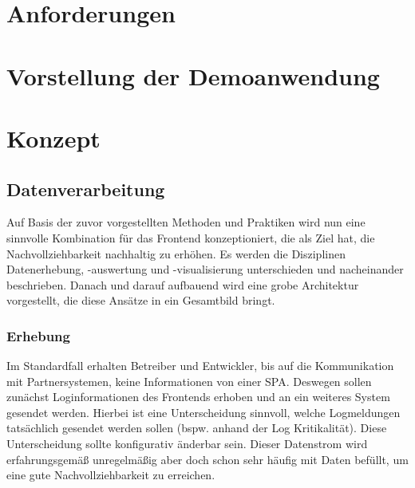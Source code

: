 	
\section{Anforderungen}

	
\section{Vorstellung der Demoanwendung}

	
\newpage
	
\section{Konzept}
	
	\subsection{Datenverarbeitung}

	Auf Basis der zuvor vorgestellten Methoden und Praktiken wird nun eine sinnvolle Kombination für das Frontend konzeptioniert, die als Ziel hat, die Nachvollziehbarkeit nachhaltig zu erhöhen. Es werden die Disziplinen Datenerhebung, -auswertung und -visualisierung unterschieden und nacheinander beschrieben. Danach und darauf aufbauend wird eine grobe Architektur vorgestellt, die diese Ansätze in ein Gesamtbild bringt.
		
	\subsubsection{Erhebung}
		
	Im Standardfall erhalten Betreiber und Entwickler, bis auf die Kommunikation mit Partnersystemen, keine Informationen von einer SPA. Deswegen sollen zunächst Loginformationen des Frontends erhoben und an ein weiteres System gesendet werden. Hierbei ist eine Unterscheidung sinnvoll, welche Logmeldungen tatsächlich gesendet werden sollen (bspw. anhand der Log Kritikalität). Diese Unterscheidung sollte konfigurativ änderbar sein. Dieser Datenstrom wird erfahrungsgemäß unregelmäßig aber doch schon sehr häufig mit Daten befüllt, um eine gute Nachvollziehbarkeit zu erreichen.
		
